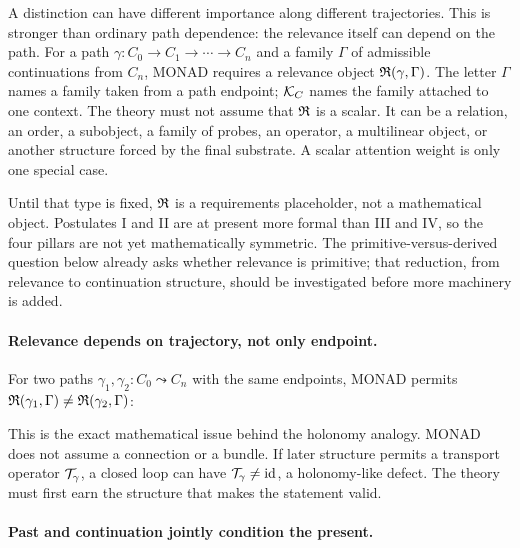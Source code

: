 A distinction can have different importance along different
trajectories. This is stronger than ordinary path dependence: the
relevance itself can depend on the path. For a path
$\gamma : C_0 \to C_1 \to \cdots \to C_n$ and a family $\Gamma$ of
admissible continuations from $C_n$, MONAD requires a relevance object
$\mathfrak{R}(\gamma, \Gamma)$. The letter $\Gamma$ names a family
taken from a path endpoint; $\mathcal{K}_{C}$ names the family attached to
one context. The theory must not assume that
$\mathfrak{R}$ is a scalar. It can be a relation, an order, a subobject,
a family of probes, an operator, a multilinear object, or another
structure forced by the final substrate. A scalar attention weight is
only one special case.


Until that type is fixed, $\mathfrak{R}$ is a requirements placeholder,
not a mathematical object. Postulates I and II are at present more
formal than III and IV, so the four pillars are not yet mathematically
symmetric. The primitive-versus-derived question below already asks
whether relevance is primitive; that reduction, from relevance to
continuation structure, should be investigated before more machinery
is added.

\paragraph{Relevance depends on trajectory, not only endpoint.}

For two paths $\gamma_1, \gamma_2 : C_0 \leadsto C_n$ with the same
endpoints, MONAD permits
$\mathfrak{R}(\gamma_1, \Gamma) \neq \mathfrak{R}(\gamma_2, \Gamma)$:


This is the exact mathematical issue behind the holonomy analogy.
MONAD does not assume a connection or a bundle. If later structure
permits a transport operator $\mathcal{T}_\gamma$, a closed loop can
have $\mathcal{T}_\gamma \neq \operatorname{id}$, a holonomy-like
defect. The theory must first earn the structure that makes the
statement valid.

\paragraph{Past and continuation jointly condition the present.}

